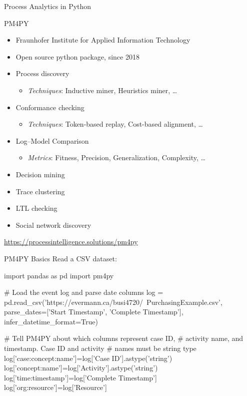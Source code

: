 \documentclass[ignorenonframetext,xcolor=x11names]{beamer}
\begin{document}
\begin{frame}[label=withcode]{Process Analytics in Python}
\begin{block}{PM4PY}
\begin{itemize}
   \item Fraunhofer Institute for Applied Information Technology
   \item Open source python package, since 2018
   \item Process discovery
   \begin{itemize}
       \item \emph{Techniques}: Inductive miner, Heuristics miner, \ldots
   \end{itemize}
   \item Conformance checking
   \begin{itemize}
       \item \emph{Techniques}: Token-based replay, Cost-based alignment, \ldots
   \end{itemize}
   \item Log--Model Comparison
   \begin{itemize}
       \item \emph{Metrics}: Fitness, Precision, Generalization, Complexity, \ldots
   \end{itemize}
   \item Decision mining
   \item Trace clustering
   \item LTL checking
   \item Social network discovery
\end{itemize}
\end{block}
\vspace{.5\baselineskip}
\url{https://processintelligence.solutions/pm4py}

\end{frame}

\begin{frame}[label=withcode,fragile]{PM4PY Basics}
Read a CSV dataset:
\footnotesize
\begin{pythoncode}
import pandas as pd
import pm4py

# Load the event log and parse date columns
log = pd.read_csv('https://evermann.ca/busi4720/\
   PurchasingExample.csv', 
   parse_dates=['Start Timestamp', 'Complete Timestamp'], 
   infer_datetime_format=True)

# Tell PM4PY about which columns represent case ID,
# activity name, and timestamp. Case ID and activity
# names must be string type
log['case:concept:name']=log['Case ID'].astype('string')
log['concept:name']=log['Activity'].astype('string')
log['time:timestamp']=log['Complete Timestamp']
log['org:resource']=log['Resource']
\end{pythoncode}

\end{frame}
\end{document}
